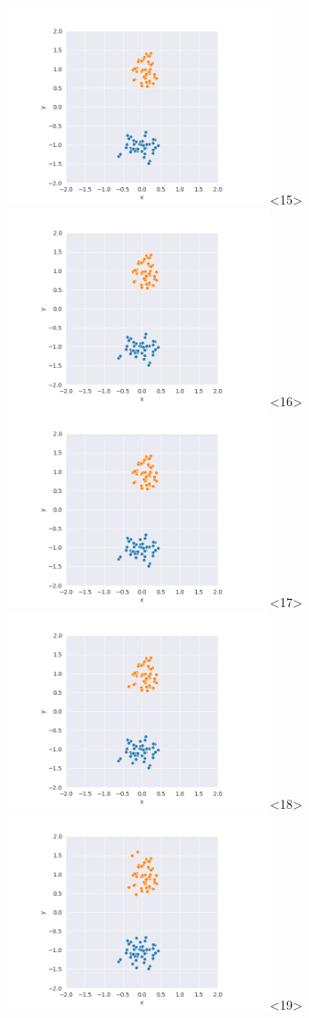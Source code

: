 \begin{frame}
  \includegraphics[width=3in]{../png/single/single_71.png}<15>
  \includegraphics[width=3in]{../png/single/single_76.png}<16>
  \includegraphics[width=3in]{../png/single/single_81.png}<17>
  \includegraphics[width=3in]{../png/single/single_86.png}<18>
  \includegraphics[width=3in]{../png/single/single_91.png}<19>
\end{frame}  
